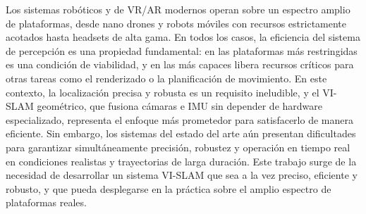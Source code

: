 Los sistemas robóticos y de VR/AR modernos operan sobre un espectro amplio de plataformas, desde nano drones y robots móviles con recursos estrictamente acotados hasta headsets de alta gama. En todos los casos, la eficiencia del sistema de percepción es una propiedad fundamental: en las plataformas más restringidas es una condición de viabilidad, y en las más capaces libera recursos críticos para otras tareas como el renderizado o la planificación de movimiento. En este contexto, la localización precisa y robusta es un requisito ineludible, y el VI-SLAM geométrico, que fusiona cámaras e IMU sin depender de hardware especializado, representa el enfoque más prometedor para satisfacerlo de manera eficiente. Sin embargo, los sistemas del estado del arte aún presentan dificultades para garantizar simultáneamente precisión, robustez y operación en tiempo real en condiciones realistas y trayectorias de larga duración. Este trabajo surge de la necesidad de desarrollar un sistema VI-SLAM que sea a la vez preciso, eficiente y robusto, y que pueda desplegarse en la práctica sobre el amplio espectro de plataformas reales.
